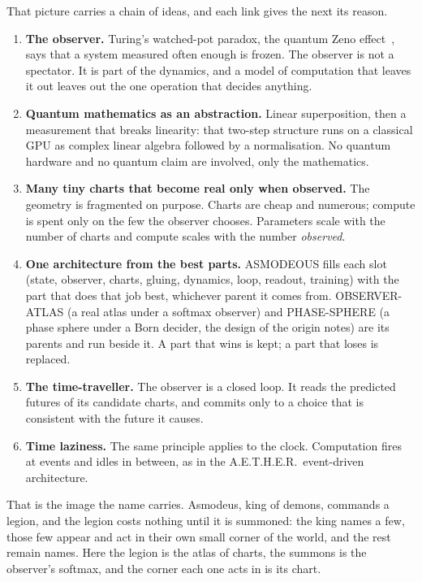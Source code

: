 That picture carries a chain of ideas, and each link gives the next its reason.
\begin{enumerate}
  \item \textbf{The observer.} Turing's watched-pot paradox, the quantum Zeno effect~\cite{misra1977zeno}, says that a system measured often enough is frozen. The observer is not a spectator. It is part of the dynamics, and a model of computation that leaves it out leaves out the one operation that decides anything.
  \item \textbf{Quantum mathematics as an abstraction.} Linear superposition, then a measurement that breaks linearity: that two-step structure runs on a classical GPU as complex linear algebra followed by a normalisation. No quantum hardware and no quantum claim are involved, only the mathematics.
  \item \textbf{Many tiny charts that become real only when observed.} The geometry is fragmented on purpose. Charts are cheap and numerous; compute is spent only on the few the observer chooses. Parameters scale with the number of charts and compute scales with the number \emph{observed}.
  \item \textbf{One architecture from the best parts.} ASMODEOUS fills each slot (state, observer, charts, gluing, dynamics, loop, readout, training) with the part that does that job best, whichever parent it comes from. OBSERVER-ATLAS (a real atlas under a softmax observer) and PHASE-SPHERE (a phase sphere under a Born decider, the design of the origin notes) are its parents and run beside it. A part that wins is kept; a part that loses is replaced.
  \item \textbf{The time-traveller.} The observer is a closed loop. It reads the predicted futures of its candidate charts, and commits only to a choice that is consistent with the future it causes.
  \item \textbf{Time laziness.} The same principle applies to the clock. Computation fires at events and idles in between, as in the A.E.T.H.E.R.\ event-driven architecture.
\end{enumerate}

That is the image the name carries. Asmodeus, king of demons, commands a legion, and the legion costs nothing until it is summoned: the king names a few, those few appear and act in their own small corner of the world, and the rest remain names. Here the legion is the atlas of charts, the summons is the observer's softmax, and the corner each one acts in is its chart.

